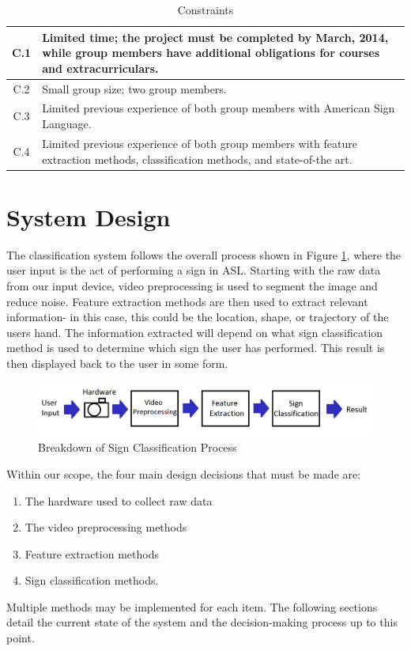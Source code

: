 \documentclass[12pt]{article}
\begin{document}
\begin{table}[h!]
\centering
\caption{Constraints}
\label{table:Constraints}
\vspace{1em}
\begin{tabular}{|c| p{14cm} |}
	\hline
	C.1 & Limited time; the project must be completed by March, 2014, while group members have additional obligations for courses and extracurriculars. \\ \hline
	C.2 & Small group size; two group members. \\ \hline
	C.3 & Limited previous experience of both group members with American Sign Language. \\  \hline
	C.4 & Limited previous experience of both group members with feature extraction methods, classification methods, and state-of-the art. \\ \hline
\end{tabular}
\end{table}

\newpage
\section{System Design}
The classification system follows the overall process shown in Figure \ref{fig:Process}, where the user input is the act of performing a sign in ASL. Starting with the raw data from our input device, video preprocessing is used to segment the image and reduce noise. Feature extraction methods are then used to extract relevant information- in this case, this could be the location, shape, or trajectory of the users hand. The information extracted will depend on what sign classification method is used to determine which sign the user has performed. This result is then displayed back to the user in some form.

\begin{figure}[h!]
  \centering
  \includegraphics[scale=1]{Process.png}
  \caption{Breakdown of Sign Classification Process}
  \label{fig:Process}
\end{figure}

Within our scope, the four main design decisions that must be made are:
\begin{enumerate}
	\item The hardware used to collect raw data 
	\item The video preprocessing methods 
	\item Feature extraction methods 
	\item Sign classification methods. 
\end{enumerate}
Multiple methods may be implemented for each item. The following sections detail the current state of the system and the decision-making process up to this point.
\end{document}

